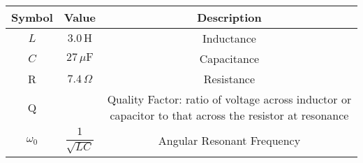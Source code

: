 \begin{tabular}{|c|c|c|}
    \hline
     \textbf{Symbol} & \textbf{Value} &
     \textbf{Description}\\
    \hline
     $L$ &  $3.0\,
     \text{H}$ & Inductance\\
    \hline 
     $C$ &  $27\, \mu\text{F}$ & Capacitance \\
    \hline
     R &  $7.4\, \Omega$ & Resistance\\
    \hline
     Q &  & \parbox{5cm}{Quality Factor: ratio of voltage across inductor or capacitor to that across the resistor at resonance}\\[8pt]
    \hline
     $\omega_0$ & $\dfrac{1}{\sqrt{LC}}$ & Angular Resonant Frequency\\[8pt]
    \hline
\end{tabular}

